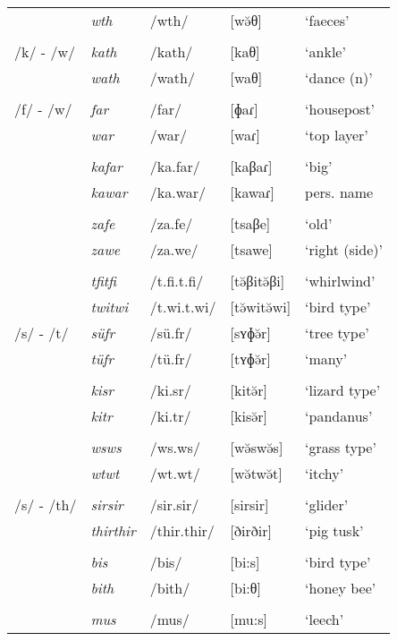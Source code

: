 \begin{table}
\begin{tabularx}{\textwidth}{lllll}
		& \emph{wth} & /wth/ & [wə̆θ]&`faeces'\\
		&&&&\\
		/k/ - /w/ & \emph{kath} & /kath/ & [kaθ]&`ankle'\\
		& \emph{wath} & /wath/ & [waθ]&`dance (n)'\\
		&&&&\\
		/f/ - /w/ & \emph{far} & /far/ & [ɸaɾ] & `housepost'\\
		& \emph{war} & /war/ & [waɾ] & `top layer'\\
		&&&&\\
		& \emph{kafar} & /ka.far/ & [kaβaɾ] & `big'\\
		& \emph{kawar} & /ka.war/ & [kawaɾ] & pers. name\\
		&&&&\\
		& \emph{zafe} & /za.fe/ & [tsaβe] & `old'\\
		& \emph{zawe} & /za.we/ & [tsawe] & `right (side)'\\
		&&&&\\
		& \emph{tfitfi} & /t.fi.t.fi/ & [tə̆βitə̆βi] & `whirlwind'\\
		& \emph{twitwi} & /t.wi.t.wi/ & [tə̆witə̆wi] & `bird type'\\
		/s/ - /t/ & \emph{süfr} & /sü.fr/ & [sʏɸə̆r] & `tree type'\\
		& \emph{tüfr} & /tü.fr/ & [tʏɸə̆r] & `many'\\
		&&&&\\
		& \emph{kisr} & /ki.sr/ & [kitə̆r] & `lizard type'\\
		& \emph{kitr} & /ki.tr/ & [kisə̆r] & `pandanus'\\
		&&&&\\
		& \emph{wsws} & /ws.ws/ & [wə̆swə̆s] & `grass type'\\
		& \emph{wtwt} & /wt.wt/ & [wə̆twə̆t] & `itchy'\\
		&&&&\\
		/s/ - /th/ & \emph{sirsir} & /sir.sir/ & [sirsir] & `glider'\\
		& \emph{thirthir} & /thir.thir/ & [ðirðir] & `pig tusk'\\
		&&&&\\
		& \emph{bis} & /bis/ & [\super{m}bi:s] & `bird type'\\
		& \emph{bith} & /bith/ & [\super{m}bi:θ] & `honey bee'\\
		&&&&\\
		& \emph{mus} & /mus/ & [mu:s] & `leech'\\

\end{tabularx}
\end{table}
